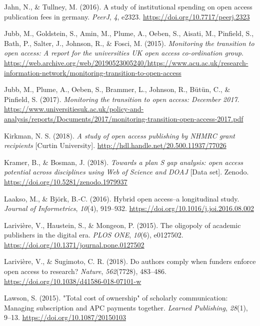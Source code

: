 \documentclass[a4paper,man,floatsintext,longtable,noextraspace,12pt]{apa6}
\newenvironment{CSLReferences}%
  {}%
  {\par}
\begin{document}
\begin{CSLReferences}{1}{0}
\leavevmode\hypertarget{ref-Jahn_2016}{}%
Jahn, N., \& Tullney, M. (2016). A study of institutional spending on
open access publication fees in germany. \emph{{PeerJ}}, \emph{4},
e2323. \url{https://doi.org/10.7717/peerj.2323}

\leavevmode\hypertarget{ref-Jubb_2015}{}%
Jubb, M., Goldstein, S., Amin, M., Plume, A., Oeben, S., Aisati, M.,
Pinfield, S., Bath, P., Salter, J., Johnson, R., \& Fosci, M. (2015).
\emph{Monitoring the transition to open access: A report for the
universities UK open access co-ordination group}.
\url{https://web.archive.org/web/20190523005240/https://www.acu.ac.uk/research-information-network/monitoring-transition-to-open-access}

\leavevmode\hypertarget{ref-Jubb_2017}{}%
Jubb, M., Plume, A., Oeben, S., Brammer, L., Johnson, R., Bütün, C., \&
Pinfield, S. (2017). \emph{Monitoring the transition to open access:
December 2017}.
\url{https://www.universitiesuk.ac.uk/policy-and-analysis/reports/Documents/2017/monitoring-transition-open-access-2017.pdf}

\leavevmode\hypertarget{ref-Kirkman_2018}{}%
Kirkman, N. S. (2018). \emph{A study of open access publishing by NHMRC
grant recipients} {[}{Curtin University}{]}.
\url{http://hdl.handle.net/20.500.11937/77026}

\leavevmode\hypertarget{ref-Kramer_2018}{}%
Kramer, B., \& Bosman, J. (2018). \emph{{Towards a plan S gap analysis:
open access potential across disciplines using Web of Science and DOAJ}}
{[}Data set{]}. Zenodo. \url{https://doi.org/10.5281/zenodo.1979937}

\leavevmode\hypertarget{ref-Laakso_2016}{}%
Laakso, M., \& Björk, B.-C. (2016). Hybrid open access--a longitudinal
study. \emph{Journal of Informetrics}, \emph{10}(4), 919--932.
\url{https://doi.org/10.1016/j.joi.2016.08.002}

\leavevmode\hypertarget{ref-Larivi_re_2015}{}%
Larivière, V., Haustein, S., \& Mongeon, P. (2015). The oligopoly of
academic publishers in the digital era. \emph{{PLOS} {ONE}},
\emph{10}(6), e0127502.
\url{https://doi.org/10.1371/journal.pone.0127502}

\leavevmode\hypertarget{ref-Larivi_re_2018}{}%
Larivière, V., \& Sugimoto, C. R. (2018). Do authors comply when funders
enforce open access to research? \emph{Nature}, \emph{562}(7728),
483--486. \url{https://doi.org/10.1038/d41586-018-07101-w}

\leavevmode\hypertarget{ref-Lawson_2015}{}%
Lawson, S. (2015). "Total cost of ownership" of scholarly communication:
Managing subscription and {APC} payments together. \emph{Learned
Publishing}, \emph{28}(1), 9--13. \url{https://doi.org/10.1087/20150103}


\end{CSLReferences}
\end{document}
